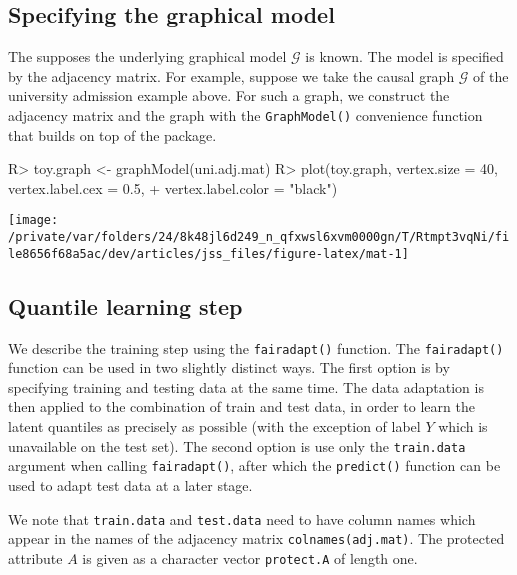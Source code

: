 \documentclass[
  notitle]{jss}
\begin{document}
\hypertarget{specifying-the-graphical-model}{%
\subsection{Specifying the graphical
model}\label{specifying-the-graphical-model}}

The  supposes the underlying graphical model
\(\mathcal{G}\) is known. The model is specified by the adjacency
matrix. For example, suppose we take the causal graph \(\mathcal{G}\) of
the university admission example above. For such a graph, we construct
the adjacency matrix and the graph with the \texttt{GraphModel()}
convenience function that builds on top of the  package.

\begin{CodeChunk}
\begin{CodeInput}
R> toy.graph <- graphModel(uni.adj.mat)
R> plot(toy.graph, vertex.size = 40, vertex.label.cex = 0.5,
+   vertex.label.color = "black")
\end{CodeInput}


\begin{center}\texttt{[image: /private/var/folders/24/8k48jl6d249\_n\_qfxwsl6xvm0000gn/T/Rtmpt3vqNi/file8656f68a5ac/dev/articles/jss\_files/figure-latex/mat-1]} \end{center}

\end{CodeChunk}

\hypertarget{quantile-learning-step}{%
\subsection{Quantile learning step}\label{quantile-learning-step}}

We describe the training step using the \texttt{fairadapt()} function.
The \texttt{fairadapt()} function can be used in two slightly distinct
ways. The first option is by specifying training and testing data at the
same time. The data adaptation is then applied to the combination of
train and test data, in order to learn the latent quantiles as precisely
as possible (with the exception of label \(Y\) which is unavailable on
the test set). The second option is use only the \texttt{train.data}
argument when calling \texttt{fairadapt()}, after which the
\texttt{predict()} function can be used to adapt test data at a later
stage.

We note that \texttt{train.data} and \texttt{test.data} need to have
column names which appear in the names of the adjacency matrix
\texttt{colnames(adj.mat)}. The protected attribute \(A\) is given as a
character vector \texttt{protect.A} of length one.
\end{document}

